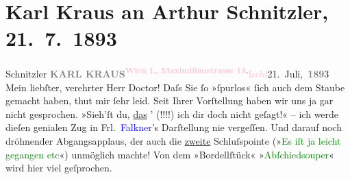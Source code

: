 

               \section[Karl Kraus an Arthur Schnitzler, 21. 7. 1893]{ Karl Kraus an Arthur Schnitzler, 21. 7. 1893}\nopagebreak{}\rehead{ }\normalsize\beginnumbering{} \toendnotes[C]{\smallbreak\pagebreak[2]} 
\toendnotes[C]{\smallbreak}\pstart{}{\pb}Schnitzler\pend{}{\bigskip}\pstart
           \noindent{}{\pb}\textcolor{gray}{\textbf{KARL KRAUS}}\hfill \substVorne{}\textsuperscript{\textcolor{gray}{\textbf{\textcolor{pink}{Wien I., Maximilianstrasse 13}{}\ledrightnote{\textcolor{pink}{Mahlerstraße}}.}}}{\allowbreak}\substDazwischen{}\textcolor{pink}{Ischl}{}\ledrightnote{\textcolor{pink}{Bad Ischl}}\substHinten{}{ }21. Juli, \textcolor{gray}{\textbf{189}}3\pend
           \pstart{}Mein liebſter, verehrter Herr Doctor!\pend\pstart
           Daſs Sie ſo »ſpurlos« ſich auch dem Staube gemacht haben, thut mir ſehr leid. Seit
               Ihrer Vorſtellung haben wir uns ja gar nicht gesprochen.\pend
           \pstart
           »Sieh’ſt du, \uline{das}{ }’ (!!!!) ich dir \introOben{}doch\introOben{}
               nicht geſagt!« – ich werde dieſen genialen Zug in Frl. \textcolor{blue}{Falkner}{}\ledrightnote{\textcolor{blue}{Julie Falkner}}’s Darſtellung nie vergeſſen. Und darauf noch dröhnender
               Abgangsapplaus, der  auch die \uline{zweite}{ }Schluſspointe (»\textcolor{green}{Es iſt ja leicht gegangen etc}{}«) unmöglich machte! Von dem
               »Bordellſtück« »\textcolor{green}{Abſchiedsouper}{}\ledrightnote{\textcolor{green}{Abschiedssouper}}« wird hier viel
               geſprochen.\pend
           \pstart
